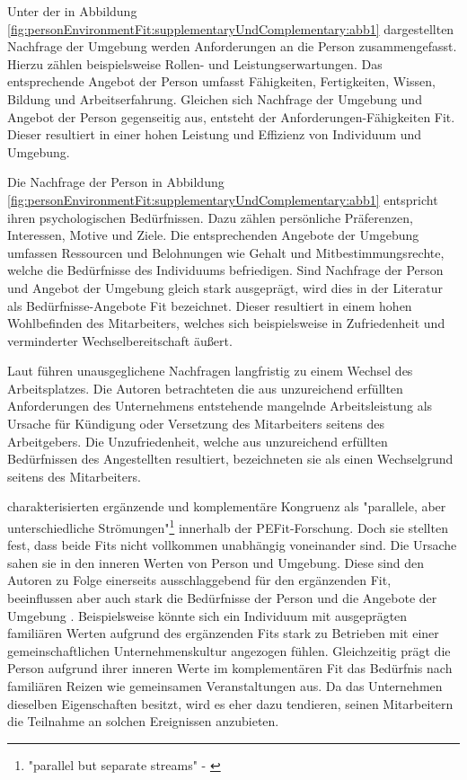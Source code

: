 Unter der in Abbildung \ref{fig:personEnvironmentFit:supplementaryUndComplementary:abb1} dargestellten Nachfrage der Umgebung werden Anforderungen an die Person zusammengefasst. Hierzu zählen beispielsweise Rollen- und Leistungserwartungen. Das entsprechende Angebot der Person umfasst Fähigkeiten, Fertigkeiten, Wissen, Bildung und Arbeitserfahrung. Gleichen sich Nachfrage der Umgebung und Angebot der Person gegenseitig aus, entsteht der Anforderungen-Fähigkeiten Fit. Dieser resultiert in einer hohen Leistung und Effizienz von Individuum und Umgebung. \cite[S. 3f.]{edwards:1991}\cite[S. 5f.]{edwards:1996}\cite[S. 4]{edwards:2007}\cite[S. 7]{su:2015}

Die Nachfrage der Person in Abbildung \ref{fig:personEnvironmentFit:supplementaryUndComplementary:abb1} entspricht ihren psychologischen Bedürfnissen. Dazu zählen persönliche Präferenzen, Interessen, Motive und Ziele. Die entsprechenden Angebote der Umgebung umfassen Ressourcen und Belohnungen wie Gehalt und Mitbestimmungsrechte, welche die Bedürfnisse des Individuums befriedigen. Sind Nachfrage der Person und Angebot der Umgebung gleich stark ausgeprägt, wird dies in der Literatur als Bedürfnisse-Angebote Fit bezeichnet. Dieser resultiert in einem hohen Wohlbefinden des Mitarbeiters, welches sich beispielsweise in Zufriedenheit und verminderter Wechselbereitschaft äußert. \cite[S. 2]{edwards:2004}\cite[S. 2f.]{edwards:1996}\cite[S. 4]{edwards:2008}\cite[S. 4f.]{edwards:2007}\cite[S. 7]{su:2015}

Laut \textcite[S. 12ff.]{workAdjustment:1964} führen unausgeglichene Nachfragen langfristig zu einem Wechsel des Arbeitsplatzes. Die Autoren betrachteten die aus unzureichend erfüllten Anforderungen des Unternehmens entstehende mangelnde Arbeitsleistung als Ursache für Kündigung oder Versetzung des Mitarbeiters seitens des Arbeitgebers. Die Unzufriedenheit, welche aus unzureichend erfüllten Bedürfnissen des Angestellten resultiert, bezeichneten sie als einen Wechselgrund seitens des Mitarbeiters.

\textcite[S. 1, Z. 2]{edwards:2004} charakterisierten ergänzende und komplementäre Kongruenz als "parallele, aber unterschiedliche Strömungen"\footnote{"parallel but separate streams" - \textcite[S. 1, Z. 2]{edwards:2004}} innerhalb der \ac{PEFit}-Forschung. Doch sie stellten fest, dass beide Fits nicht vollkommen unabhängig voneinander sind. Die Ursache sahen sie in den inneren Werten von Person und Umgebung. Diese sind den Autoren zu Folge einerseits ausschlaggebend für den ergänzenden Fit, beeinflussen aber auch stark die Bedürfnisse der Person und die Angebote der Umgebung \cite[S. 3]{edwards:2004}. Beispielsweise könnte sich ein Individuum mit ausgeprägten familiären Werten aufgrund des ergänzenden Fits stark zu Betrieben mit einer gemeinschaftlichen Unternehmenskultur angezogen fühlen. Gleichzeitig prägt die Person aufgrund ihrer inneren Werte im komplementären Fit das Bedürfnis nach familiären Reizen wie gemeinsamen Veranstaltungen aus. Da das Unternehmen dieselben Eigenschaften besitzt, wird es eher dazu tendieren, seinen Mitarbeitern die Teilnahme an solchen Ereignissen anzubieten.

